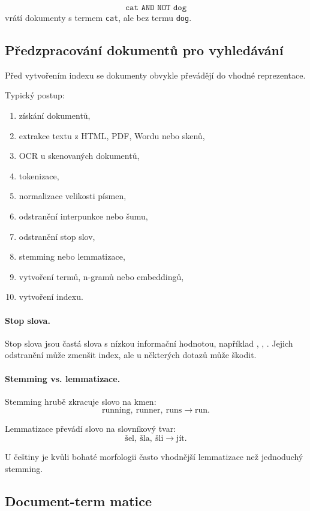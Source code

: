 \[
\texttt{cat AND NOT dog}
\]
vrátí dokumenty s termem \texttt{cat}, ale bez termu \texttt{dog}.

\subsection{Předzpracování dokumentů pro vyhledávání}

Před vytvořením indexu se dokumenty obvykle převádějí do vhodné reprezentace.

Typický postup:
\begin{enumerate}
    \item získání dokumentů,
    \item extrakce textu z HTML, PDF, Wordu nebo skenů,
    \item OCR u skenovaných dokumentů,
    \item tokenizace,
    \item normalizace velikosti písmen,
    \item odstranění interpunkce nebo šumu,
    \item odstranění stop slov,
    \item stemming nebo lemmatizace,
    \item vytvoření termů, n-gramů nebo embeddingů,
    \item vytvoření indexu.
\end{enumerate}

\paragraph{Stop slova.}
Stop slova jsou častá slova s nízkou informační hodnotou, například , , .
Jejich odstranění může zmenšit index, ale u některých dotazů může škodit.

\paragraph{Stemming vs. lemmatizace.}
Stemming hrubě zkracuje slovo na kmen:
\[
\text{running},\ \text{runner},\ \text{runs}
\rightarrow
\text{run}.
\]

Lemmatizace převádí slovo na slovníkový tvar:
\[
\text{šel},\ \text{šla},\ \text{šli}
\rightarrow
\text{jít}.
\]

U češtiny je kvůli bohaté morfologii často vhodnější lemmatizace než jednoduchý stemming.

\subsection{Document-term matice}


